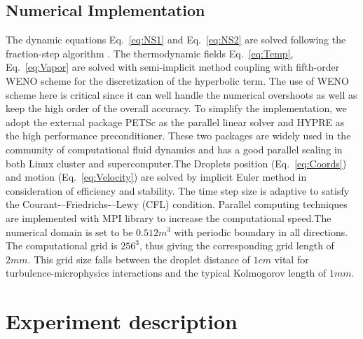 \documentclass[draft,jgrga]{AGUTeX}
\newcommand{\Eq}[1]{Eq.~\eqref{#1}} \newcommand{\Fig}[1]{Figure~\ref{#1}}
\begin{document}
\begin{article}
\subsection{Numerical Implementation}
The dynamic equations \Eq{eq:NS1} and \Eq{eq:NS2} are solved following the fraction-step algorithm \cite{Brown2001}. The thermodynamic fields \Eq{eq:Temp}, \Eq{eq:Vapor} are solved with semi-implicit method coupling with fifth-order WENO scheme for the discretization of the hyperbolic term. The use of WENO scheme here is critical since it can well handle the numerical overshoots as well as keep the high order of the overall accuracy. To simplify the implementation, we adopt the external package PETSc \cite{petsc_cite} as the parallel linear solver and HYPRE \cite{hypre_cite} as the high performance preconditioner. These two packages are widely used in the community of computational fluid dynamics and has a good parallel scaling in both Linux cluster and supercomputer.The Droplets position (\Eq{eq:Coords}) and motion (\Eq{eq:Velocity}) are solved by implicit Euler method in consideration of efficiency and stability. The time step size is adaptive to satisfy the Courant-–Friedrichs-–Lewy (CFL) condition. Parallel computing techniques are implemented with MPI library to increase the computational speed.The numerical domain is set to be $0.512m^{3}$ with periodic boundary in all directions. The computational grid is $256^{3}$, thus giving the corresponding grid length of $2mm$. This grid size falls between the droplet distance of $1cm$ vital for turbulence-microphysics interactions and the typical Kolmogorov length of $1mm$.

\section{Experiment description}\label{experiment_description}


\end{article}
\end{document}
